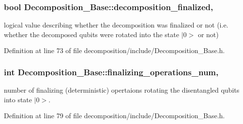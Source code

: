 \subsubsection[{\texorpdfstring{decomposition\+\_\+finalized}{decomposition_finalized}}]{\setlength{\rightskip}{0pt plus 5cm}bool Decomposition\+\_\+\+Base\+::decomposition\+\_\+finalized\hspace{0.3cm}{\ttfamily [protected]}, {\ttfamily [inherited]}}\hypertarget{class_decomposition___base_a488bfdaecfefa4fb9fb3149657b40b6d}{}\label{class_decomposition___base_a488bfdaecfefa4fb9fb3149657b40b6d}


logical value describing whether the decomposition was finalized or not (i.\+e. whether the decomposed qubits were rotated into the state $\vert$0$>$ or not) 



Definition at line 73 of file decomposition/include/\+Decomposition\+\_\+\+Base.\+h.

\subsubsection[{\texorpdfstring{finalizing\+\_\+operations\+\_\+num}{finalizing_operations_num}}]{\setlength{\rightskip}{0pt plus 5cm}int Decomposition\+\_\+\+Base\+::finalizing\+\_\+operations\+\_\+num\hspace{0.3cm}{\ttfamily [protected]}, {\ttfamily [inherited]}}\hypertarget{class_decomposition___base_a0685291401fc40fee1121eddba63a429}{}\label{class_decomposition___base_a0685291401fc40fee1121eddba63a429}


number of finalizing (deterministic) opertaions rotating the disentangled qubits into state $\vert$0$>$. 



Definition at line 79 of file decomposition/include/\+Decomposition\+\_\+\+Base.\+h.

